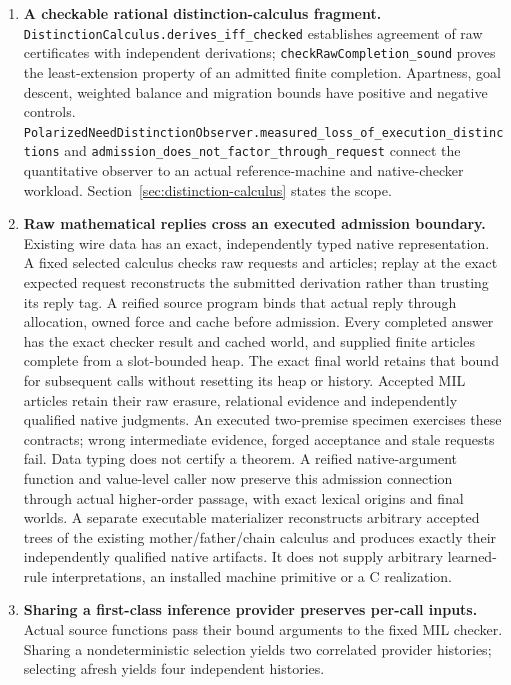 \documentclass[11pt]{article}
\theoremstyle{definition}
\theoremstyle{remark}
\begin{document}
\begin{enumerate}
\item \textbf{A checkable rational distinction-calculus fragment.}
  \nolinkurl{DistinctionCalculus.derives_iff_checked} establishes agreement
  of raw certificates with independent derivations;
  \nolinkurl{checkRawCompletion_sound} proves the least-extension property
  of an admitted finite completion. Apartness, goal descent, weighted
  balance and migration bounds have positive and negative controls.
  \nolinkurl{PolarizedNeedDistinctionObserver.measured_loss_of_execution_distinctions}
  and \nolinkurl{admission_does_not_factor_through_request} connect the
  quantitative observer to an actual reference-machine and native-checker
  workload. Section~\ref{sec:distinction-calculus} states the scope.
\item \textbf{Raw mathematical replies cross an executed admission boundary.}
  Existing wire data has an exact, independently typed native representation.
  A fixed selected calculus checks raw requests and articles; replay at the
  exact expected request reconstructs the submitted derivation rather than
  trusting its reply tag. A reified source program binds that actual reply
  through allocation, owned force and cache before admission. Every completed
  answer has the exact checker result and cached world, and supplied finite
  articles complete from a slot-bounded heap. The exact final world retains
  that bound for subsequent calls without resetting its heap or history.
  Accepted MIL articles retain their
  raw erasure, relational evidence and independently qualified native
  judgments. An executed two-premise specimen exercises these contracts;
  wrong intermediate evidence, forged acceptance and stale requests fail.
  Data typing does not certify a theorem. A reified native-argument function
  and value-level caller now preserve this admission connection through
  actual higher-order passage, with exact lexical origins and final worlds.
  A separate executable materializer reconstructs arbitrary accepted trees
  of the existing mother/father/chain calculus and produces exactly their
  independently qualified native artifacts. It does not supply arbitrary
  learned-rule interpretations, an installed machine primitive or a C
  realization.
\item \textbf{Sharing a first-class inference provider preserves per-call inputs.}
  Actual source functions pass their bound arguments to the fixed MIL
  checker. Sharing a nondeterministic selection yields two correlated
  provider histories; selecting afresh yields four independent histories.

\end{enumerate}
\end{document}
